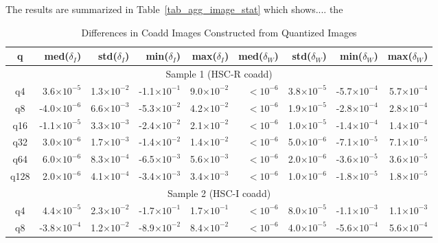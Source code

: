 The results are summarized in Table~\ref{tab_agg_image_stat} which shows....
the 

\begin{table}
\caption{Differences in Coadd Images Constructed from Quantized Images}
\centering
\begin{tabular}[]{crrrrrrrr}
\hline
 q        &  med($\delta_I$) & std($\delta_I$) & min($\delta_I$) & max($\delta_I$) & med($\delta_W$) & std($\delta_W$) & min($\delta_W$) & max($\delta_W$) \\
\hline
\multicolumn{9}{c}{Sample 1 (HSC-R coadd)}  \\
\hline
  q4    &  3.6$\times 10^{-5}$ & 1.3$\times 10^{-2}$ & -1.1$\times 10^{-1}$ & 9.0$\times 10^{-2}$ & $<10^{-6}$ & 3.8$\times 10^{-5}$ & -5.7$\times 10^{-4}$ & 5.7$\times 10^{-4}$ \\ 
  q8    & -4.0$\times 10^{-6}$ & 6.6$\times 10^{-3}$ & -5.3$\times 10^{-2}$ & 4.2$\times 10^{-2}$ & $<10^{-6}$ & 1.9$\times 10^{-5}$ & -2.8$\times 10^{-4}$ & 2.8$\times 10^{-4}$ \\
  q16   & -1.1$\times 10^{-5}$ & 3.3$\times 10^{-3}$ & -2.4$\times 10^{-2}$ & 2.1$\times 10^{-2}$ & $<10^{-6}$ & 1.0$\times 10^{-5}$ & -1.4$\times 10^{-4}$ & 1.4$\times 10^{-4}$ \\
  q32   &  3.0$\times 10^{-6}$ & 1.7$\times 10^{-3}$ & -1.4$\times 10^{-2}$ & 1.4$\times 10^{-2}$ & $<10^{-6}$ & 5.0$\times 10^{-6}$ & -7.1$\times 10^{-5}$ & 7.1$\times 10^{-5}$ \\
  q64   &  6.0$\times 10^{-6}$ & 8.3$\times 10^{-4}$ & -6.5$\times 10^{-3}$ & 5.6$\times 10^{-3}$ & $<10^{-6}$ & 2.0$\times 10^{-6}$ & -3.6$\times 10^{-5}$ & 3.6$\times 10^{-5}$ \\
  q128  &  2.0$\times 10^{-6}$ & 4.1$\times 10^{-4}$ & -3.4$\times 10^{-3}$ & 3.4$\times 10^{-3}$ & $<10^{-6}$ & 1.0$\times 10^{-6}$ & -1.8$\times 10^{-5}$ & 1.8$\times 10^{-5}$ \\
\hline 
\multicolumn{9}{c}{Sample 2 (HSC-I coadd)}  \\
\hline
  q4    &  4.4$\times 10^{-5}$ & 2.3$\times 10^{-2}$ & -1.7$\times 10^{-1}$ & 1.7$\times 10^{-1}$ & $<10^{-6}$ & 8.0$\times 10^{-5}$ & -1.1$\times 10^{-3}$ & 1.1$\times 10^{-3}$ \\
  q8    & -3.8$\times 10^{-4}$ & 1.2$\times 10^{-2}$ & -8.9$\times 10^{-2}$ & 8.4$\times 10^{-2}$ & $<10^{-6}$ & 4.0$\times 10^{-5}$ & -5.6$\times 10^{-4}$ & 5.6$\times 10^{-4}$ \\

\end{tabular}
\end{table}
